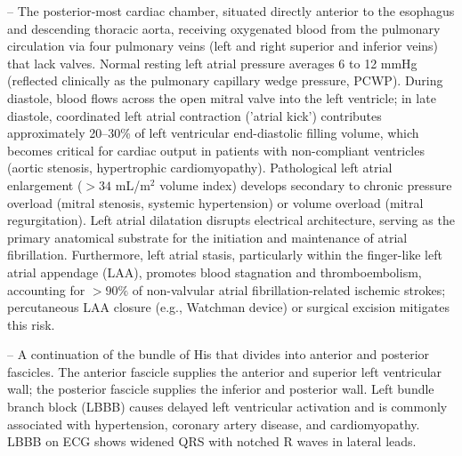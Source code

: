 -- The posterior-most cardiac chamber, situated directly anterior to the esophagus and descending thoracic aorta, receiving oxygenated blood from the pulmonary circulation via four pulmonary veins (left and right superior and inferior veins) that lack valves. Normal resting left atrial pressure averages 6 to 12 mmHg (reflected clinically as the pulmonary capillary wedge pressure, PCWP). During diastole, blood flows across the open mitral valve into the left ventricle; in late diastole, coordinated left atrial contraction ('atrial kick') contributes approximately 20--30\% of left ventricular end-diastolic filling volume, which becomes critical for cardiac output in patients with non-compliant ventricles (aortic stenosis, hypertrophic cardiomyopathy). Pathological left atrial enlargement ($>34$ mL/m$^2$ volume index) develops secondary to chronic pressure overload (mitral stenosis, systemic hypertension) or volume overload (mitral regurgitation). Left atrial dilatation disrupts electrical architecture, serving as the primary anatomical substrate for the initiation and maintenance of atrial fibrillation. Furthermore, left atrial stasis, particularly within the finger-like left atrial appendage (LAA), promotes blood stagnation and thromboembolism, accounting for $>90\%$ of non-valvular atrial fibrillation-related ischemic strokes; percutaneous LAA closure (e.g., Watchman device) or surgical excision mitigates this risk.

-- A continuation of the bundle of His that divides into anterior and posterior fascicles. The anterior fascicle supplies the anterior and superior left ventricular wall; the posterior fascicle supplies the inferior and posterior wall. Left bundle branch block (LBBB) causes delayed left ventricular activation and is commonly associated with hypertension, coronary artery disease, and cardiomyopathy. LBBB on ECG shows widened QRS with notched R waves in lateral leads.

